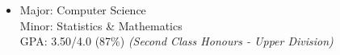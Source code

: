 \documentclass[a4paper,11pt]{article}
\begin{document}
\begin{itemize}
\item[] Major: Computer Science \\
  Minor: Statistics \& Mathematics \\
  GPA: 3.50/4.0 (87\%) \emph{(Second Class Honours - Upper Division)}
\end{itemize}
\end{document}
